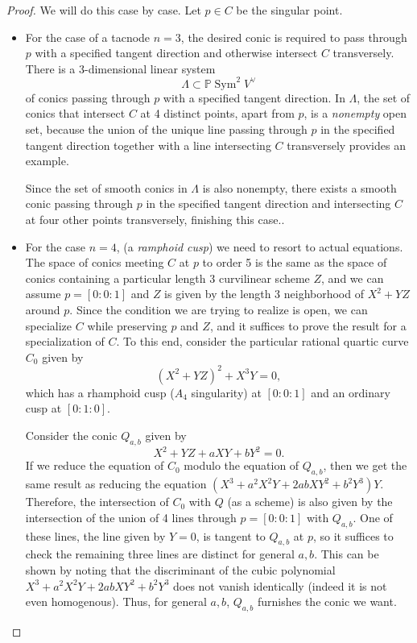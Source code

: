 \documentclass[12 pt, reqno]{amsart}
\theoremstyle{definition}
\newcommand{\on}{\operatorname}
\newcommand{\mb}{\mathbb}
\renewcommand{\P}{\mb{P}}
\begin{document}
\begin{proof}
  We will do this case by case. Let $p\in C$ be the singular point.

  \begin{itemize}
  \item [{\bf Case $n=3$}:] For the case of a tacnode $n=3$, the
    desired conic is required to pass through $p$ with a specified
    tangent direction and otherwise intersect $C$ transversely. There
    is a $3$-dimensional linear system
  \[\Lambda \subset \P \on{Sym}^{2}V^{\vee}\]
  of conics passing through $p$ with a specified tangent direction. In
  $\Lambda$, the set of conics that intersect $C$ at 4 distinct
  points, apart from $p$, is a {\sl nonempty} open set, because the
  union of the unique line passing through $p$ in the specified
  tangent direction together with a line intersecting $C$ transversely
  provides an example.

  Since the set of smooth conics in $\Lambda$ is also nonempty, there
  exists a smooth conic passing through $p$ in the specified tangent
  direction and intersecting $C$ at four other points transversely,
  finishing this case..

\item [{\bf Case $n=4$}:] For the case $n=4$, (a {\sl ramphoid cusp})
  we need to resort to actual equations. The space of conics meeting
  $C$ at $p$ to order 5 is the same as the space of conics containing
  a particular length 3 curvilinear scheme $Z$, and we can assume
  $p=[0:0:1]$ and $Z$ is given by the length 3 neighborhood of
  $X^2+YZ$ around $p$. Since the condition we are trying to realize is
  open, we can specialize $C$ while preserving $p$ and $Z$, and it
  suffices to prove the result for a specialization of $C$. To this
  end, consider the particular rational quartic curve $C_0$ given by
$$(X^2+YZ)^2+X^3Y=0,$$ which has a rhamphoid cusp ($A_4$ singularity) at $[0:0:1]$ and an ordinary cusp at $[0:1:0]$.

Consider the conic $Q_{a,b}$ given by \[X^2+YZ+aXY+bY^2=0.\] If we
reduce the equation of $C_0$ modulo the equation of $Q_{a,b}$, then we
get the same result as reducing the equation
$(X^3+a^2X^2Y+2abXY^2+b^2Y^3)Y$. Therefore, the intersection of $C_0$
with $Q$ (as a scheme) is also given by the intersection of the union
of 4 lines through $p=[0:0:1]$ with $Q_{a,b}$. One of these lines, the
line given by $Y=0$, is tangent to $Q_{a,b}$ at $p$, so it suffices to
check the remaining three lines are distinct for general $a,b$. This
can be shown by noting that the discriminant of the cubic polynomial
$X^3+a^2X^2Y+2abXY^2+b^2Y^3$ does not vanish identically (indeed it is
not even homogenous). Thus, for general $a,b$, $Q_{a,b}$ furnishes the
conic we want.


\end{itemize}
\end{proof}
\end{document}

